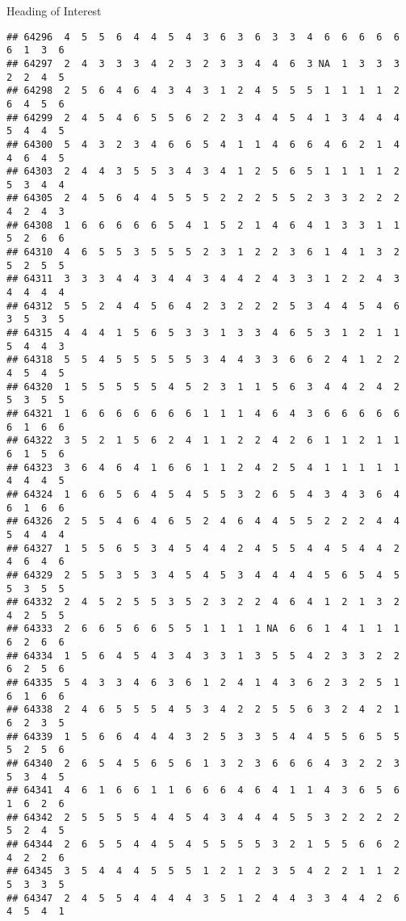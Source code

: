 \documentclass[
  ignorenonframetext,
]{beamer}
\begin{document}
\begin{frame}[fragile]{Heading of Interest}
\begin{verbatim}
## 64296  4  5  5  6  4  4  5  4  3  6  3  6  3  3  4  6  6  6  6  6  6  1  3  6
## 64297  2  4  3  3  3  4  2  3  2  3  3  4  4  6  3 NA  1  3  3  3  2  2  4  5
## 64298  2  5  6  4  6  4  3  4  3  1  2  4  5  5  5  1  1  1  1  2  6  4  5  6
## 64299  2  4  5  4  6  5  5  6  2  2  3  4  4  5  4  1  3  4  4  4  5  4  4  5
## 64300  5  4  3  2  3  4  6  6  5  4  1  1  4  6  6  4  6  2  1  4  4  6  4  5
## 64303  2  4  4  3  5  5  3  4  3  4  1  2  5  6  5  1  1  1  1  2  5  3  4  4
## 64305  2  4  5  6  4  4  5  5  5  2  2  2  5  5  2  3  3  2  2  2  4  2  4  3
## 64308  1  6  6  6  6  6  5  4  1  5  2  1  4  6  4  1  3  3  1  1  5  2  6  6
## 64310  4  6  5  5  3  5  5  5  2  3  1  2  2  3  6  1  4  1  3  2  5  2  5  5
## 64311  3  3  3  4  4  3  4  4  3  4  4  2  4  3  3  1  2  2  4  3  4  4  4  4
## 64312  5  5  2  4  4  5  6  4  2  3  2  2  2  5  3  4  4  5  4  6  3  5  3  5
## 64315  4  4  4  1  5  6  5  3  3  1  3  3  4  6  5  3  1  2  1  1  5  4  4  3
## 64318  5  5  4  5  5  5  5  5  3  4  4  3  3  6  6  2  4  1  2  2  4  5  4  5
## 64320  1  5  5  5  5  5  4  5  2  3  1  1  5  6  3  4  4  2  4  2  5  3  5  5
## 64321  1  6  6  6  6  6  6  6  1  1  1  4  6  4  3  6  6  6  6  6  6  1  6  6
## 64322  3  5  2  1  5  6  2  4  1  1  2  2  4  2  6  1  1  2  1  1  6  1  5  6
## 64323  3  6  4  6  4  1  6  6  1  1  2  4  2  5  4  1  1  1  1  1  4  4  4  5
## 64324  1  6  6  5  6  4  5  4  5  5  3  2  6  5  4  3  4  3  6  4  6  1  6  6
## 64326  2  5  5  4  6  4  6  5  2  4  6  4  4  5  5  2  2  2  4  4  5  4  4  4
## 64327  1  5  5  6  5  3  4  5  4  4  2  4  5  5  4  4  5  4  4  2  4  6  4  6
## 64329  2  5  5  3  5  3  4  5  4  5  3  4  4  4  4  5  6  5  4  5  5  3  5  5
## 64332  2  4  5  2  5  5  3  5  2  3  2  2  4  6  4  1  2  1  3  2  4  2  5  5
## 64333  2  6  6  5  6  6  5  5  1  1  1  1 NA  6  6  1  4  1  1  1  6  2  6  6
## 64334  1  5  6  4  5  4  3  4  3  3  1  3  5  5  4  2  3  3  2  2  6  2  5  6
## 64335  5  4  3  3  4  6  3  6  1  2  4  1  4  3  6  2  3  2  5  1  6  1  6  6
## 64338  2  4  6  5  5  5  4  5  3  4  2  2  5  5  6  3  2  4  2  1  6  2  3  5
## 64339  1  5  6  6  4  4  4  3  2  5  3  3  5  4  4  5  5  6  5  5  5  2  5  6
## 64340  2  6  5  4  5  6  5  6  1  3  2  3  6  6  6  4  3  2  2  3  5  3  4  5
## 64341  4  6  1  6  6  1  1  6  6  6  4  6  4  1  1  4  3  6  5  6  1  6  2  6
## 64342  2  5  5  5  5  4  4  5  4  3  4  4  4  5  5  3  2  2  2  2  5  2  4  5
## 64344  2  6  5  5  4  4  5  4  5  5  5  5  3  2  1  5  5  6  6  2  4  2  2  6
## 64345  3  5  4  4  4  5  5  5  1  2  1  2  3  5  4  2  2  1  1  2  5  3  3  5
## 64347  2  4  5  5  4  4  4  4  3  5  1  2  4  4  3  3  4  4  2  6  4  5  4  1

\end{verbatim}
\end{frame}
\end{document}
